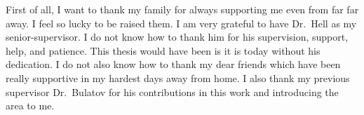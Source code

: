 
%
%

First of all, I want to thank my family for always supporting me even from far far away.
I feel so lucky to be raised them.
I am very grateful to have Dr.~Hell as my senior-supervisor.
I do not know how to thank him for his supervision, support, help, and patience. 
This thesis would have been is it is today without his dedication.
I do not also know how to thank my dear friends which have been really supportive in my hardest
days away from home.
I also thank my previous supervisor Dr.~Bulatov for his contributions in this work and introducing
the area to me.

